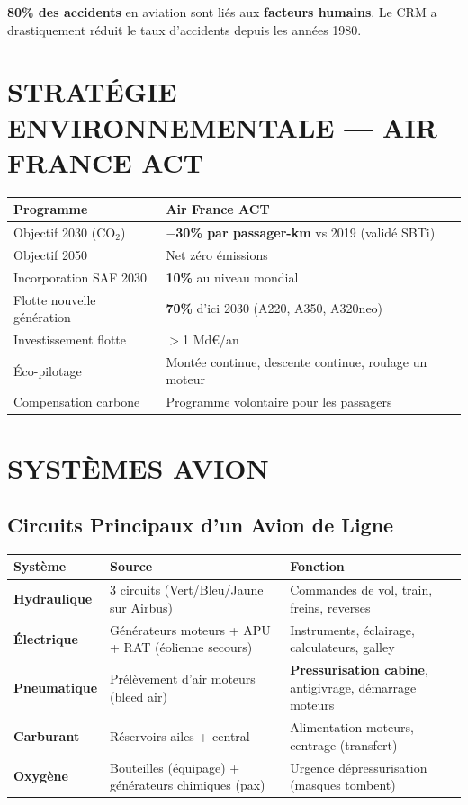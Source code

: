 \begin{memobox}
\textbf{80\% des accidents} en aviation sont liés aux \textbf{facteurs humains}. Le CRM a drastiquement réduit le taux d'accidents depuis les années 1980.
\end{memobox}

\section{STRATÉGIE ENVIRONNEMENTALE --- AIR FRANCE ACT}

\begin{tabular}{p{5cm}p{9.5cm}}
\toprule
\textbf{Programme} & \textbf{Air France ACT} \\
\midrule
Objectif 2030 (CO$_2$) & \textbf{$-$30\% par passager-km} vs 2019 (validé SBTi) \\
Objectif 2050 & Net zéro émissions \\
Incorporation SAF 2030 & \textbf{10\%} au niveau mondial \\
Flotte nouvelle génération & \textbf{70\%} d'ici 2030 (A220, A350, A320neo) \\
Investissement flotte & $>$1 Md\euro/an \\
Éco-pilotage & Montée continue, descente continue, roulage un moteur \\
Compensation carbone & Programme volontaire pour les passagers \\
\bottomrule
\end{tabular}

\section{SYSTÈMES AVION}

\subsection{Circuits Principaux d'un Avion de Ligne}

\begin{tabular}{p{3.5cm}p{4cm}p{7cm}}
\toprule
\textbf{Système} & \textbf{Source} & \textbf{Fonction} \\
\midrule
\textbf{Hydraulique} & 3 circuits (Vert/Bleu/Jaune sur Airbus) & Commandes de vol, train, freins, reverses \\
\textbf{Électrique} & Générateurs moteurs + APU + RAT (éolienne secours) & Instruments, éclairage, calculateurs, galley \\
\textbf{Pneumatique} & Prélèvement d'air moteurs (bleed air) & \textbf{Pressurisation cabine}, antigivrage, démarrage moteurs \\
\textbf{Carburant} & Réservoirs ailes + central & Alimentation moteurs, centrage (transfert) \\
\textbf{Oxygène} & Bouteilles (équipage) + générateurs chimiques (pax) & Urgence dépressurisation (masques tombent) \\
\bottomrule
\end{tabular}

